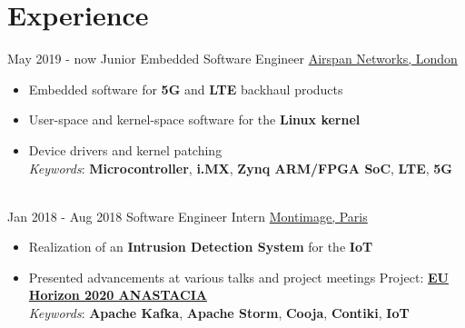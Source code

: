 \documentclass[letterpaper]{twentysecondcv} %
\begin{document}
\makeprofile %


\section{Experience}

\begin{twenty} %
    \twentyitem
    	{May 2019 -}
		{now}
        {Junior Embedded Software Engineer}
        {\href{https://www.airspan.com/}{Airspan Networks, London}}
        {}
        {
            \begin{itemize}
                \item Embedded software for \textbf{5G} and \textbf{LTE} backhaul products            
                \item User-space and kernel-space software for the \textbf{Linux kernel}
                \item Device drivers and kernel patching \\
                \textit{Keywords}: \textbf{Microcontroller}, \textbf{i.MX}, \textbf{Zynq ARM/FPGA SoC}, \textbf{LTE}, \textbf{5G}
            \end{itemize}
        }\\
    \twentyitem
    	{Jan 2018 -}
		{Aug 2018}
        {Software Engineer Intern}
        {\href{https://www.montimage.com/}{Montimage, Paris}}
        {}
        {
            \begin{itemize}
                \item Realization of an \textbf{Intrusion Detection System} for the \textbf{IoT}
                \item Presented advancements at various talks and project meetings
                Project: \href{http://www.anastacia-h2020.eu/}{\textbf{EU Horizon 2020 ANASTACIA}}\\
                \textit{Keywords}: \textbf{Apache Kafka}, \textbf{Apache Storm}, \textbf{Cooja}, \textbf{Contiki}, \textbf{IoT}

\end{itemize}}
\end{twenty}
\end{document}
